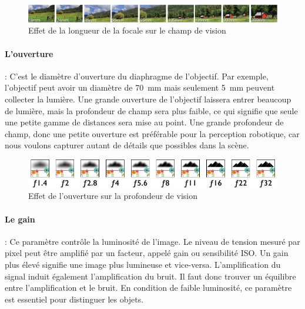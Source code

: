 \documentclass[../thesis.tex]{subfiles}
\begin{document}
    \vspace{-0.2em}
    \begin{figure}[H]
        \centering
        \includegraphics[width=\linewidth]{img/biblio/camera-focal}
        \caption{Effet de la longueur de la focale sur le champ de vision}
        \label{fig:03-camera-focal}
    \end{figure}
    
    \vspace{-0.5em}
    \paragraph{L'ouverture} : C'est le diamètre d'ouverture du diaphragme de l'objectif. Par exemple, l'objectif peut avoir un diamètre de \SI{70}{mm} mais seulement \SI{5}{mm} peuvent collecter la lumière. Une grande ouverture de l'objectif laissera entrer beaucoup de lumière, mais la profondeur de champ sera plus faible, ce qui signifie que seule une petite gamme de distances sera mise au point. Une grande profondeur de champ, donc une petite ouverture est préférable pour la perception robotique, car nous voulons capturer autant de détails que possibles dans la scène.
    
    \begin{figure}[H]
        \centering
        \includegraphics[width=\linewidth]{img/biblio/camera-apperture}
        \caption{Effet de l'ouverture sur la profondeur de vision}
        \label{fig:03-camera-apperture}
    \end{figure}
    
    \vspace{-0.5em}
    \paragraph{Le gain} : Ce paramètre contrôle la luminosité de l'image. Le niveau de tension mesuré par pixel peut être amplifié par un facteur, appelé gain ou sensibilité ISO. Un gain plus élevé signifie une image plus lumineuse et vice-versa. L'amplification du signal induit également l'amplification du bruit. Il faut donc trouver un équilibre entre l'amplification et le bruit. En condition de faible luminosité, ce paramètre est essentiel pour distinguer les objets.
    
\end{document}
